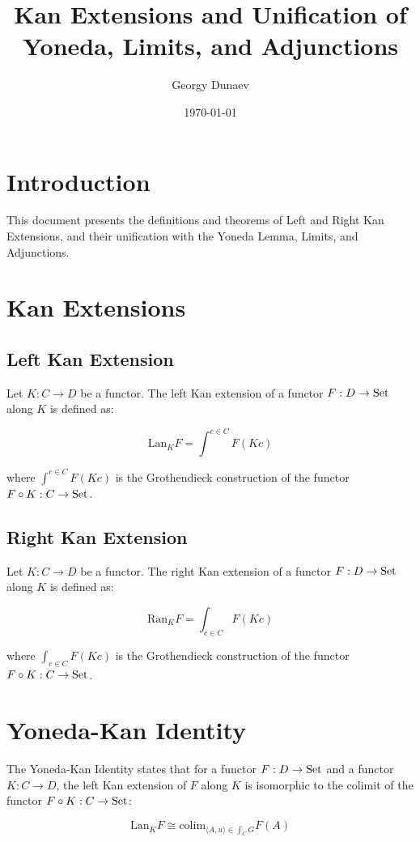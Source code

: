 \documentclass[10pt,a4paper]{article}
\title{Kan Extensions and Unification of Yoneda, Limits, and Adjunctions}
\author{Georgy Dunaev}
\date{\today}
\begin{document}
\maketitle

\section{Introduction}
This document presents the definitions and theorems of Left and Right Kan Extensions, and their unification with the Yoneda Lemma, Limits, and Adjunctions.

\section{Kan Extensions}

\subsection{Left Kan Extension}

Let $K : C \to D$ be a functor. The left Kan extension of a functor $F : D \to {\textrm{Set}}$ along $K$ is defined as:

\[\mathrm{Lan}_K F = \int^{c \in C} F(Kc)
\]

where $\int^{c \in C} F(Kc)$ is the Grothendieck construction of the functor $F \circ K : C \to {\textrm{Set}}$.

\subsection{Right Kan Extension}

Let $K : C \to D$ be a functor. The right Kan extension of a functor $F : D \to {\textrm{Set}}$ along $K$ is defined as:

\[\mathrm{Ran}_K F = \int_{c \in C} F(Kc)
\]

where $\int_{c \in C} F(Kc)$ is the Grothendieck construction of the functor $F \circ K : C \to {\textrm{Set}}$.

\section{Yoneda-Kan Identity}

The Yoneda-Kan Identity states that for a functor $F : D \to {\textrm{Set}}$ and a functor $K : C \to D$, the left Kan extension of $F$ along $K$ is isomorphic to the colimit of the functor $F \circ K : C \to {\textrm{Set}}$:

\[\mathrm{Lan}_K F \cong \mathrm{colim}_{\langle A, u \rangle \in \int_C G} F(A)
\]
\end{document}
